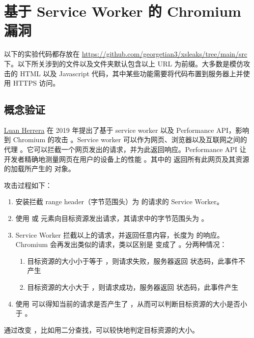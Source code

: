 \section{基于 Service Worker 的 Chromium 漏洞}

以下的实验代码都存放在 \url{https://github.com/georgetian3/xsleaks/tree/main/src} 下。以下所关涉到的文件以及文件夹默认包含以上 URL 为前缀。大多数是模仿攻击的 HTML 以及 Javascript 代码，其中某些功能需要将代码布置到服务器上并使用 HTTPS 访问。

\subsection{概念验证}

\href{https://blog.lbherrera.me/}{Luan Herrera} 在 2019 年提出了基于 service worker 以及 Performance API，影响到 Chromium 的攻击 \cite{herrera}。Service worker 可以作为网页、浏览器以及互联网之间的代理 \cite{sw} 。它可以拦截一个网页发出的请求，并为此返回响应。Performance API 让开发者精确地测量网页在用户的设备上的性能 \cite{papi}。其中的  返回所有此网页及其资源的加载所产生的  对象。

攻击过程如下：

\begin{enumerate}
    \item 安装拦截 range header（字节范围头）为  的请求的 Service Worker。
    \item 使用  或  元素向目标资源发出请求，其请求中的字节范围头为 。
    \item Service Worker 拦截以上的请求，并返回任意内容，长度为  的响应。Chromium 会再发出类似的请求，类以区别是  变成了 。分两种情况：
    \begin{enumerate}
        \item 目标资源的大小小于等于 ，则请求失败，服务器返回  状态码，此事件不产生 
        \item 目标资源的大小大于 ，则请求成功，服务器返回  状态码，此事件产生 
    \end{enumerate}
    \item 使用  可以得知当前的请求是否产生了 ，从而可以判断目标资源的大小是否小于 。
\end{enumerate}

通过改变 ，比如用二分查找，可以较快地判定目标资源的大小。

